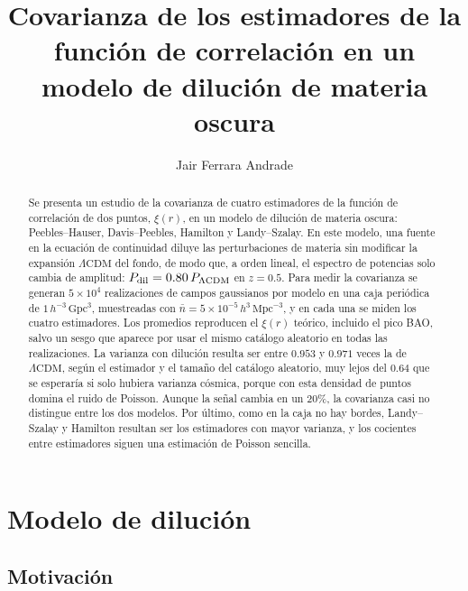 \documentclass[letterpaper, 12pt]{article}
\title{Covarianza de los estimadores de la función de correlación en un modelo de dilución de materia oscura}
\author{Jair Ferrara Andrade}
\newcommand{\LCDM}{\Lambda\mathrm{CDM}}
\begin{document}

    \maketitle

    \begin{abstract}
        Se presenta un estudio de la covarianza de cuatro estimadores de la función de correlación de dos puntos, $\xi(r)$, en un modelo de dilución de materia oscura: Peebles--Hauser, Davis--Peebles, Hamilton y Landy--Szalay. En este modelo, una fuente en la ecuación de continuidad diluye las perturbaciones de materia sin modificar la expansión $\LCDM$ del fondo, de modo que, a orden lineal, el espectro de potencias solo cambia de amplitud: $P_{\rm dil} = 0.80\,P_{\LCDM}$ en $z = 0.5$. Para medir la covarianza se generan $5\times10^4$ realizaciones de campos gaussianos por modelo en una caja periódica de $1\,h^{-3}\,\mathrm{Gpc}^3$, muestreadas con $\bar n = 5\times10^{-5}\,h^{3}\,\mathrm{Mpc}^{-3}$, y en cada una se miden los cuatro estimadores. Los promedios reproducen el $\xi(r)$ teórico, incluido el pico BAO, salvo un sesgo que aparece por usar el mismo catálogo aleatorio en todas las realizaciones. La varianza con dilución resulta ser entre $0.953$ y $0.971$ veces la de $\LCDM$, según el estimador y el tamaño del catálogo aleatorio, muy lejos del $0.64$ que se esperaría si solo hubiera varianza cósmica, porque con esta densidad de puntos domina el ruido de Poisson. Aunque la señal cambia en un 20\%, la covarianza casi no distingue entre los dos modelos. Por último, como en la caja no hay bordes, Landy--Szalay y Hamilton resultan ser los estimadores con mayor varianza, y los cocientes entre estimadores siguen una estimación de Poisson sencilla.
    \end{abstract}

    \unamindice

    \section{Modelo de dilución}\label{sec:modelo}

        \subsection{Motivación}
\end{document}

